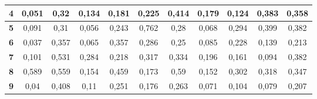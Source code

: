\begin{table}[]
{\begin{tabular}{ccccccccccc}
\multicolumn{1}{|c|}{\textbf{4}}        & \multicolumn{1}{c|}{0,051}             & \multicolumn{1}{c|}{0,32}           & \multicolumn{1}{c|}{0,134}             & \multicolumn{1}{c|}{0,181}          & \multicolumn{1}{c|}{0,225}             & \multicolumn{1}{c|}{0,414}          & \multicolumn{1}{c|}{0,179}             & \multicolumn{1}{c|}{0,124}          & \multicolumn{1}{c|}{0,383}             & \multicolumn{1}{c|}{0,358}          \\ \hline
\multicolumn{1}{|c|}{\textbf{5}}        & \multicolumn{1}{c|}{0,091}             & \multicolumn{1}{c|}{0,31}           & \multicolumn{1}{c|}{0,056}             & \multicolumn{1}{c|}{0,243}          & \multicolumn{1}{c|}{0,762}             & \multicolumn{1}{c|}{0,28}           & \multicolumn{1}{c|}{0,068}             & \multicolumn{1}{c|}{0,294}          & \multicolumn{1}{c|}{0,399}             & \multicolumn{1}{c|}{0,382}          \\ \hline
\multicolumn{1}{|c|}{\textbf{6}}        & \multicolumn{1}{c|}{0,037}             & \multicolumn{1}{c|}{0,357}          & \multicolumn{1}{c|}{0,065}             & \multicolumn{1}{c|}{0,357}          & \multicolumn{1}{c|}{0,286}             & \multicolumn{1}{c|}{0,25}           & \multicolumn{1}{c|}{0,085}             & \multicolumn{1}{c|}{0,228}          & \multicolumn{1}{c|}{0,139}             & \multicolumn{1}{c|}{0,213}          \\ \hline
\multicolumn{1}{|c|}{\textbf{7}}        & \multicolumn{1}{c|}{0,101}             & \multicolumn{1}{c|}{0,531}          & \multicolumn{1}{c|}{0,284}             & \multicolumn{1}{c|}{0,218}          & \multicolumn{1}{c|}{0,317}             & \multicolumn{1}{c|}{0,334}          & \multicolumn{1}{c|}{0,196}             & \multicolumn{1}{c|}{0,161}          & \multicolumn{1}{c|}{0,094}             & \multicolumn{1}{c|}{0,382}          \\ \hline
\multicolumn{1}{|c|}{\textbf{8}}        & \multicolumn{1}{c|}{0,589}             & \multicolumn{1}{c|}{0,559}          & \multicolumn{1}{c|}{0,154}             & \multicolumn{1}{c|}{0,459}          & \multicolumn{1}{c|}{0,173}             & \multicolumn{1}{c|}{0,59}           & \multicolumn{1}{c|}{0,152}             & \multicolumn{1}{c|}{0,302}          & \multicolumn{1}{c|}{0,318}             & \multicolumn{1}{c|}{0,347}          \\ \hline
\multicolumn{1}{|c|}{\textbf{9}}        & \multicolumn{1}{c|}{0,04}              & \multicolumn{1}{c|}{0,408}          & \multicolumn{1}{c|}{0,11}              & \multicolumn{1}{c|}{0,251}          & \multicolumn{1}{c|}{0,176}             & \multicolumn{1}{c|}{0,263}          & \multicolumn{1}{c|}{0,071}             & \multicolumn{1}{c|}{0,104}          & \multicolumn{1}{c|}{0,079}             & \multicolumn{1}{c|}{0,207}          \\ \hline

\end{tabular}}
\end{table}

